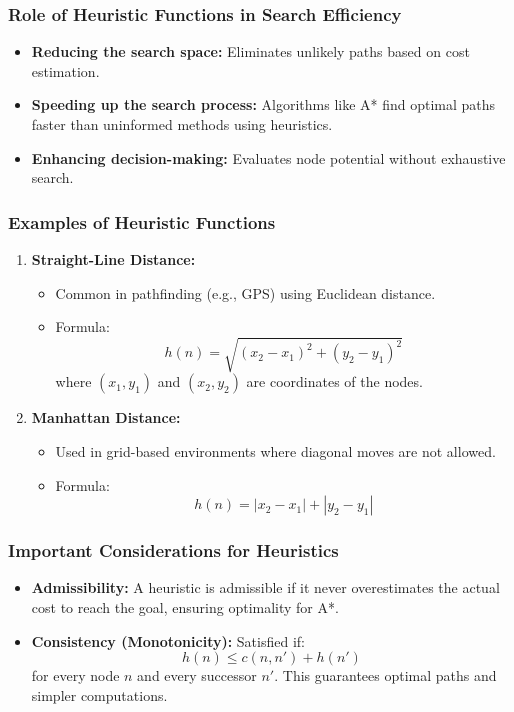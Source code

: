 \documentclass[aspectratio=169]{beamer}
\begin{document}
\begin{frame}[fragile]
    \frametitle{Role of Heuristic Functions in Search Efficiency}
    \begin{itemize}
        \item \textbf{Reducing the search space:} Eliminates unlikely paths based on cost estimation.
        \item \textbf{Speeding up the search process:} Algorithms like A* find optimal paths faster than uninformed methods using heuristics.
        \item \textbf{Enhancing decision-making:} Evaluates node potential without exhaustive search.
    \end{itemize}
\end{frame}

\begin{frame}[fragile]
    \frametitle{Examples of Heuristic Functions}
    \begin{enumerate}
        \item \textbf{Straight-Line Distance:}
            \begin{itemize}
                \item Common in pathfinding (e.g., GPS) using Euclidean distance.
                \item Formula: 
                \[
                h(n) = \sqrt{(x_2 - x_1)^2 + (y_2 - y_1)^2}
                \]
                where \((x_1, y_1)\) and \((x_2, y_2)\) are coordinates of the nodes.
            \end{itemize}

        \item \textbf{Manhattan Distance:}
            \begin{itemize}
                \item Used in grid-based environments where diagonal moves are not allowed.
                \item Formula:
                \[
                h(n) = |x_2 - x_1| + |y_2 - y_1|
                \]
            \end{itemize}
    \end{enumerate}
\end{frame}

\begin{frame}[fragile]
    \frametitle{Important Considerations for Heuristics}
    \begin{itemize}
        \item \textbf{Admissibility:} A heuristic is admissible if it never overestimates the actual cost to reach the goal, ensuring optimality for A*.
        \item \textbf{Consistency (Monotonicity):} Satisfied if:
        \[
        h(n) \leq c(n, n') + h(n')
        \]
        for every node \( n \) and every successor \( n' \). This guarantees optimal paths and simpler computations.
    \end{itemize}
\end{frame}
\end{document}
